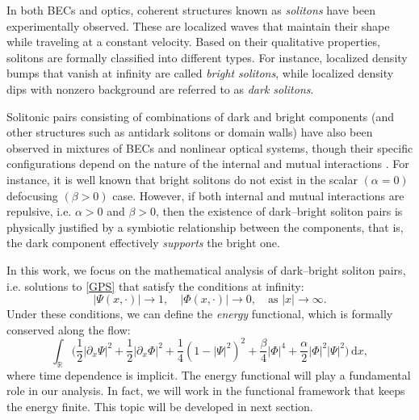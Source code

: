 \documentclass[11pt]{article}
\renewcommand{\d}{\,\mathrm{d}}
\theoremstyle{plain}
\theoremstyle{definition}
\theoremstyle{remark}
\numberwithin{equation}{section}
\begin{document}
{In both BECs and optics, coherent structures {known} as \emph{solitons} have been experimentally observed. These are localized waves that maintain their shape while traveling at a constant velocity. Based on their qualitative properties, solitons are formally classified into different types. For instance, localized density bumps that vanish at infinity are called \emph{bright solitons}, while localized density dips with nonzero background are referred to as \emph{dark solitons}. 

Solitonic pairs consisting of combinations of dark and bright components (and other structures such as antidark solitons or domain walls) have also been observed in mixtures of BECs and nonlinear optical systems, though their specific configurations depend on the nature of the internal and mutual interactions \cite{KevNisFraMalCar}. For instance, it is well known that bright solitons do not exist in the scalar $(\alpha=0)$ defocusing $(\beta>0)$ case. However, if both internal and mutual interactions are repulsive, i.e. $\alpha>0$ and $\beta>0$, then the  existence of dark--bright soliton pairs is physically justified by a symbiotic relationship between the components, that is, the dark component effectively \emph{supports} the bright one. 

In this work, we focus on the mathematical analysis of dark--bright soliton pairs, i.e. solutions to \eqref{GPS} that satisfy the conditions at infinity:
\begin{equation}\label{condinfty}
|\Psi(x,\cdot)|\to 1,\quad |\Phi(x,\cdot)|\to 0,\quad\text{as }|x|\to\infty.
\end{equation}
Under these conditions, we can define the \emph{energy} functional, which is formally conserved along the flow:
\begin{equation}\label{eq:originalenergy}
\int_{\mathbb{R}}\Big( \frac{1}{2}|\partial_x\Psi|^2+\frac{1}{2}|\partial_x\Phi|^2+\frac{1}{4}(1-|\Psi|^2)^2+\frac{\beta}{4}|\Phi|^4 +\frac{\alpha}{2}|\Phi|^2|\Psi|^2 \Big)\d x,
\end{equation}
where time dependence is implicit. The energy functional will play a fundamental role in our analysis. In fact, we will work in the functional framework that keeps the energy finite. This topic will be developed in next section.


}
\end{document}
